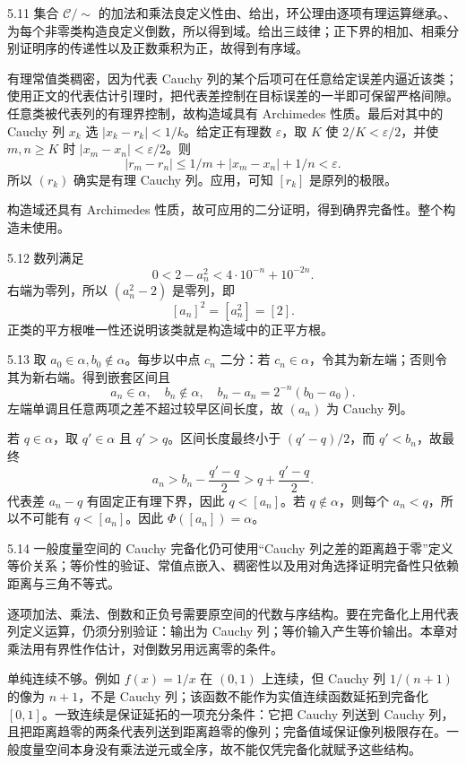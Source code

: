 \begin{solution}{5.11}
集合 \(\mathcal C/\sim\) 的加法和乘法良定义性由、给出，环公理由逐项有理运算继承。、为每个非零类构造良定义倒数，所以得到域。给出三歧律；正下界的相加、相乘分别证明序的传递性以及正数乘积为正，故得到有序域。

有理常值类稠密，因为代表 Cauchy 列的某个后项可在任意给定误差内逼近该类；使用正文的代表估计引理时，把代表差控制在目标误差的一半即可保留严格间隙。任意类被代表列的有理界控制，故构造域具有 Archimedes 性质。最后对其中的 Cauchy 列 \(x_k\) 选 \(|x_k-r_k|<1/k\)。给定正有理数 \(\varepsilon\)，取 \(K\) 使 \(2/K<\varepsilon/2\)，并使 \(m,n\ge K\) 时 \(|x_m-x_n|<\varepsilon/2\)。则
\[
 |r_m-r_n|\le 1/m+|x_m-x_n|+1/n<\varepsilon.
\]
所以 \((r_k)\) 确实是有理 Cauchy 列。应用，可知 \([r_k]\) 是原列的极限。

构造域还具有 Archimedes 性质，故可应用的二分证明，得到确界完备性。整个构造未使用。
\end{solution}

\begin{solution}{5.12}
数列满足
\[
 0<2-a_n^2<4\cdot10^{-n}+10^{-2n}.
\]
右端为零列，所以 \((a_n^2-2)\) 是零列，即
\[
 [a_n]^2=[a_n^2]=[2].
\]
正类的平方根唯一性还说明该类就是构造域中的正平方根。
\end{solution}

\begin{solution}{5.13}
取 \(a_0\in\alpha,b_0\notin\alpha\)。每步以中点 \(c_n\) 二分：若 \(c_n\in\alpha\)，令其为新左端；否则令其为新右端。得到嵌套区间且
\[
 a_n\in\alpha,\quad b_n\notin\alpha,\quad
 b_n-a_n=2^{-n}(b_0-a_0).
\]
左端单调且任意两项之差不超过较早区间长度，故 \((a_n)\) 为 Cauchy 列。

若 \(q\in\alpha\)，取 \(q'\in\alpha\) 且 \(q'>q\)。区间长度最终小于 \((q'-q)/2\)，而 \(q'<b_n\)，故最终
\[
 a_n>b_n-\frac{q'-q}{2}>q+\frac{q'-q}{2}.
\]
代表差 \(a_n-q\) 有固定正有理下界，因此 \(q<[a_n]\)。若 \(q\notin\alpha\)，则每个 \(a_n<q\)，所以不可能有 \(q<[a_n]\)。因此 \(\Phi([a_n])=\alpha\)。
\end{solution}

\begin{solution}{5.14}
一般度量空间的 Cauchy 完备化仍可使用“Cauchy 列之差的距离趋于零”定义等价关系；等价性的验证、常值点嵌入、稠密性以及用对角选择证明完备性只依赖距离与三角不等式。

逐项加法、乘法、倒数和正负号需要原空间的代数与序结构。要在完备化上用代表列定义运算，仍须分别验证：输出为 Cauchy 列；等价输入产生等价输出。本章对乘法用有界性作估计，对倒数另用远离零的条件。

单纯连续不够。例如 \(f(x)=1/x\) 在 \((0,1)\) 上连续，但 Cauchy 列 \(1/(n+1)\) 的像为 \(n+1\)，不是 Cauchy 列；该函数不能作为实值连续函数延拓到完备化 \([0,1]\)。一致连续是保证延拓的一项充分条件：它把 Cauchy 列送到 Cauchy 列，且把距离趋零的两条代表列送到距离趋零的像列；完备值域保证像列极限存在。一般度量空间本身没有乘法逆元或全序，故不能仅凭完备化就赋予这些结构。
\end{solution}

